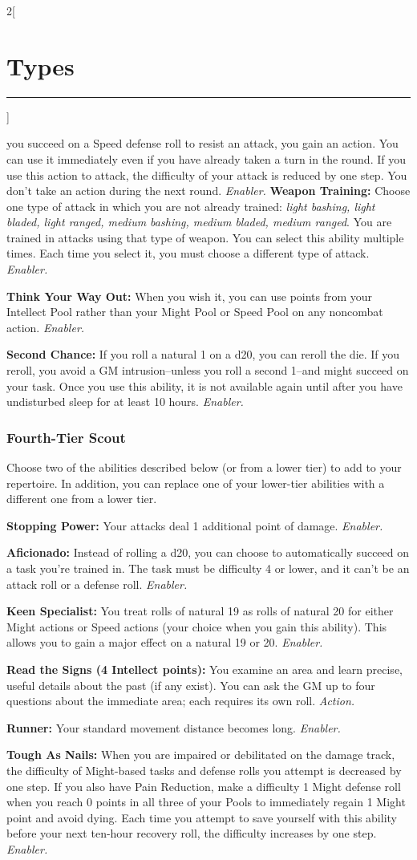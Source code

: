 \documentclass[a4paper,10pt,final]{book}
\newcommand{\HRule}{\rule{\linewidth}{0.5mm}} %
\newcommand{\newSection}[1]{\section*{#1} \addcontentsline{toc}{section}{#1} \label{sec:#1} \HRule}
\newcommand{\itemAbility}[2]{\textcolor{25gray}{\textbullet\textbf{ #1:}} {#2}\par}
\newcommand{\enabler}{\textit{ Enabler.}}
\newcommand{\action}{\textit{ Action.}}
\newenvironment{docsection}[1]
{
  \begin{multicols*}{2}[\newSection{#1}]
}
{
  \end{multicols*}
  \newpage
}
\begin{document}
\begin{docsection}{Types}
{you succeed on a Speed defense roll to
resist an attack, you gain an action. You can
use it immediately even if you have already
taken a turn in the round. If you use this
action to attack, the difficulty of your attack
is reduced by one step. You don’t take an
action during the next round. \enabler}
\itemAbility{Weapon Training}{Choose one type of
attack in which you are not already trained:
\textit{light bashing, light bladed, light ranged,
medium bashing, medium bladed, medium
ranged}. You are trained in attacks
using that type of weapon. You can select
this ability multiple times. Each time you
select it, you must choose a different type of
attack.\enabler}
\itemAbility{Think Your Way Out}{When you wish it,
you can use points from your Intellect Pool
rather than your Might Pool or Speed Pool
on any noncombat action.\enabler}
\itemAbility{Second Chance}{If you roll a natural 1
on a d20, you can reroll the die. If you reroll,
you avoid a GM intrusion--unless you roll a
second 1--and might succeed on your task.
Once you use this ability, it is not available
again until after you have undisturbed sleep for at least 10 hours.\enabler}

\subsubsection*{Fourth-Tier Scout}
\label{subsub:scoutFourthTier}
Choose two of the abilities described
below (or from a lower tier) to add to your
repertoire. In addition, you can replace one
of your lower-tier abilities with a different
one from a lower tier.\par
\itemAbility{Stopping Power}{Your attacks deal 1
additional point of damage.\enabler}
\itemAbility{Aficionado}{Instead of rolling a d20, you can
choose to automatically succeed on a task
you’re trained in. The task must be difficulty
4 or lower, and it can’t be an attack roll or a
defense roll.\enabler}
\itemAbility{Keen Specialist}{You treat rolls of natural
19 as rolls of natural 20 for either Might
actions or Speed actions (your choice when
you gain this ability). This allows you to gain
a major effect on a natural 19 or 20.\enabler}
\itemAbility{Read the Signs (4 Intellect points)}{You
examine an area and learn precise, useful details
about the past (if any exist). You can ask the GM
up to four questions about the immediate area;
each requires its own roll.\action}
\itemAbility{Runner}{Your standard movement
distance becomes long.\enabler}
\itemAbility{Tough As Nails}{When you are impaired
or debilitated on the damage track, the
difficulty of Might-based tasks and defense rolls you attempt is decreased by one step.
If you also have Pain Reduction, make a
difficulty 1 Might defense roll when you
reach 0 points in all three of your Pools
to immediately regain 1 Might point and
avoid dying. Each time you attempt to
save yourself with this ability before your
next ten-hour recovery roll, the difficulty
increases by one step.\enabler}


\end{docsection}
\end{document}
